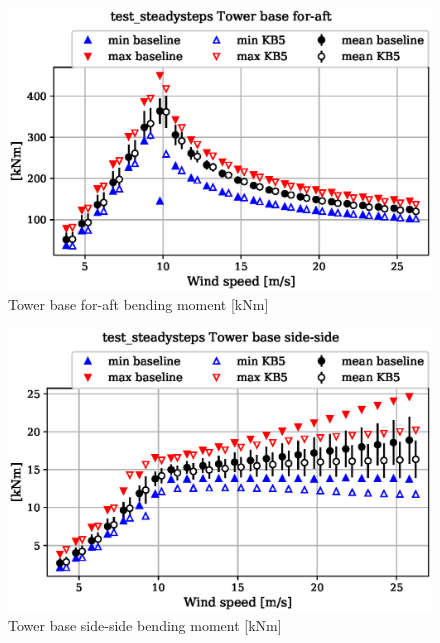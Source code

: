 \begin{figure}[!ht]
\begin{center}
	\includegraphics[width=.85\linewidth]{figures/baseline-vs-KB6/test_steadysteps/tower-tower-node-001-momentvec-x_AA0008_AA0008.eps}
\end{center}
\caption{Tower base for-aft bending moment [kNm]}
\label{fig:baseline-vs-KB6:test_steadysteps:tower-base-fa}
\end{figure}

\begin{figure}[!ht]
\begin{center}
	\includegraphics[width=.85\linewidth]{figures/baseline-vs-KB6/test_steadysteps/tower-tower-node-001-momentvec-y_AA0008_AA0008.eps}
\end{center}
\caption{Tower base side-side bending moment [kNm]}
\label{fig:baseline-vs-KB6:test_steadysteps:tower-base-ss}
\end{figure}

